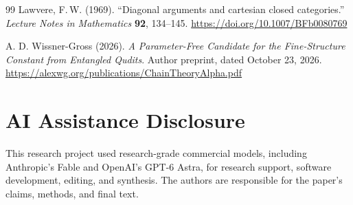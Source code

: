 \documentclass[11pt]{article}
\theoremstyle{definition}
\theoremstyle{remark}
\begin{document}
{\begin{thebibliography}{99}
Lawvere, F.\,W. (1969). ``Diagonal arguments and cartesian closed categories.'' \emph{Lecture Notes in Mathematics} \textbf{92}, 134--145. \url{https://doi.org/10.1007/BFb0080769}

A. D. Wissner-Gross (2026). \emph{A Parameter-Free Candidate for the
Fine-Structure Constant from Entangled Qudits}. Author preprint, dated
October 23, 2026. \url{https://alexwg.org/publications/ChainTheoryAlpha.pdf}

\end{thebibliography}}

\section*{AI Assistance Disclosure}
This research project used research-grade commercial models, including
Anthropic's Fable and OpenAI's GPT-6 Astra, for research support, software
development, editing, and synthesis. The authors are responsible for the
paper's claims, methods, and final text.
\end{document}
